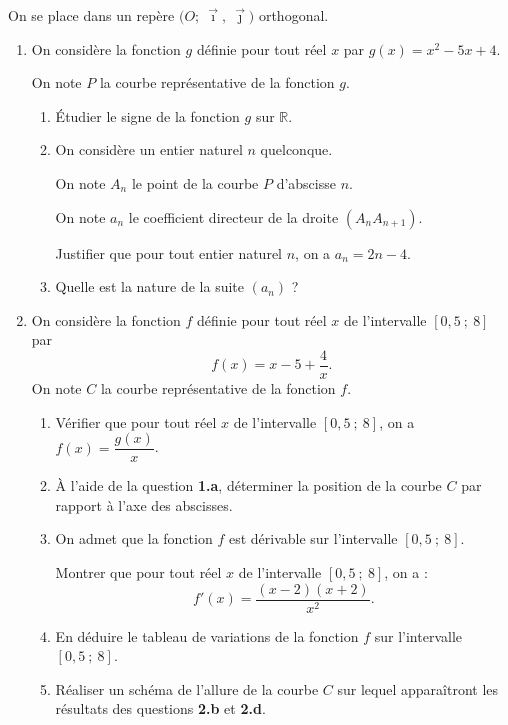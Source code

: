 On se place dans un repère $\big(O;~\vec{\imath},~\vec{\jmath}\big)$ orthogonal.

\begin{enumerate}
\item On considère la fonction $g$ définie pour tout réel $x$ par $g(x) = x^2 - 5x + 4$.

On note $P$ la courbe représentative de la fonction $g$.
	\begin{enumerate}
	\item Étudier le signe de la fonction $g$ sur $\mathbb{R}$.
	\item On considère un entier naturel $n$ quelconque.
	
	On note $A_n$ le point de la courbe $P$ d'abscisse $n$.
	
	On note $a_n$ le coefficient directeur de la droite $(A_nA_{n+1})$.

	Justifier que pour tout entier naturel $n$, on a $a_n = 2n - 4$.
	\item Quelle est la nature de la suite $(a_n)$ ?
	\end{enumerate}

\bigskip

\item On considère la fonction $f$ définie pour tout réel $x$ de l'intervalle $[0,5~;~8]$ par
\[f(x) = x - 5 + \dfrac{4}{x}.\]
On note $C$ la courbe représentative de la fonction $f$.
	\begin{enumerate}
	\item Vérifier que pour tout réel $x$ de l'intervalle $[0,5~;~8]$, on a $f(x) = \dfrac{g(x)}{x}$.
	\item À l'aide de la question \textbf{1.a}, déterminer la position de la courbe $C$ par rapport à l'axe des abscisses.
	\item On admet que la fonction $f$ est dérivable sur l'intervalle $[0,5~;~8]$.
	
	Montrer que pour tout réel $x$ de l'intervalle $[0,5~;~8]$, on a :
\[f'(x) = \dfrac{(x - 2)(x + 2)}{x^2}.\]
	\item En déduire le tableau de variations de la fonction $f$ sur l'intervalle $[0,5~;~8]$.
	\item Réaliser un schéma de l'allure de la courbe $C$ sur lequel apparaîtront les résultats des questions \textbf{2.b} et \textbf{2.d}.
	\end{enumerate}
\end{enumerate}
